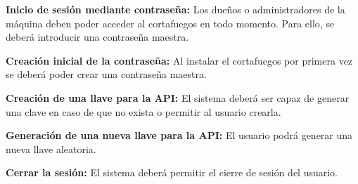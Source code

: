 \begin{functional}
        \item \textbf{Inicio de sesión mediante contraseña:} Los dueños o administradores de la máquina deben poder acceder al cortafuegos en todo momento. Para ello, se deberá introducir una contraseña maestra.
        \item \textbf{Creación inicial de la contraseña:} Al instalar el cortafuegos por primera vez se deberá poder crear una contraseña maestra.
        \item \textbf{Creación de una llave para la API:} El sistema deberá ser capaz de generar una clave en caso de que no exista o permitir al usuario crearla.
        \item \textbf{Generación de una nueva llave para la API:} El usuario podrá generar una nueva llave aleatoria.
        \item \textbf{Cerrar la sesión:} El sistema deberá permitir el cierre de sesión del usuario.
\end{functional}

